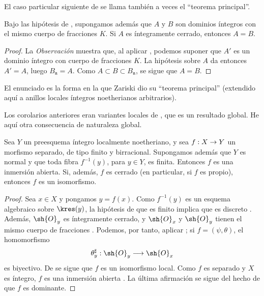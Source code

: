 \documentclass[oneside]{amsart}
\makeatletter
\newcommand{\ega@arrow}[2]{\mathchoice{#1}{#2}{#2}{#2}}
\renewcommand{\to}{\ega@arrow{\longrightarrow}{\rightarrow}}
\let\EGAOriginalLabel\label
\renewcommand{\label}[1]{\phantomsection\EGAOriginalLabel{#1}}
\makeatother
\begin{document}
El caso particular siguiente de  se llama también a
veces el ``teorema principal''.

\begin{corollary}[4.4.8]
\label{III.4.4.8}
Bajo las hipótesis de , supongamos además que $A$ y
$B$ son dominios íntegros con el mismo cuerpo de fracciones $K$.
Si $A$ es íntegramente cerrado, entonces $A=B$.
\end{corollary}

\begin{proof}
La \emph{Observación}  muestra que, al aplicar
, podemos suponer que $A'$ es un dominio íntegro con
cuerpo de fracciones $K$. La hipótesis sobre $A$ da entonces
$A'=A$, luego $B_{\mathfrak n}=A$. Como
$A\subset B\subset B_{\mathfrak n}$, se sigue que $A=B$.
\end{proof}

El enunciado  es la forma en la que Zariski dio su
``teorema principal'' (extendido aquí a anillos locales íntegros
noetherianos arbitrarios).

Los corolarios anteriores eran variantes locales de
, que es un resultado global. He aquí otra
consecuencia de naturaleza global.

\begin{corollary}[4.4.9]
\label{III.4.4.9}
Sea $Y$ un preesquema íntegro localmente noetheriano, y sea
$f:X\to Y$ un morfismo separado, de tipo finito y birracional.
Supongamos además que $Y$ es normal y que toda fibra $f^{-1}(y)$,
para $y\in Y$, es finita. Entonces $f$ es una inmersión abierta. Si,
además, $f$ es cerrado (en particular, si $f$ es propio), entonces
$f$ es un isomorfismo.
\end{corollary}

\begin{proof}
Sea $x\in X$ y pongamos $y=f(x)$. Como $f^{-1}(y)$ es un esquema
algebraico sobre $\kres(y)$, la hipótesis de que es finito implica que
es discreto . Además, $\sh{O}_y$ es íntegramente
cerrado, y $\sh{O}_x$ y $\sh{O}_y$ tienen el mismo cuerpo de fracciones
. Podemos, por tanto, aplicar
; si $f=(\psi,\theta)$, el homomorfismo
\[
  \theta_y^\sharp:\sh{O}_y\longrightarrow\sh{O}_x
\]
es biyectivo. De  se sigue que $f$ es un isomorfismo
local. Como $f$ es separado y $X$ es íntegro, $f$ es una inmersión
abierta . La última afirmación se sigue del hecho de
que $f$ es dominante.
\end{proof}
\end{document}
